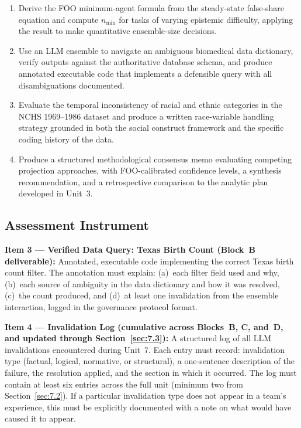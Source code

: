 \begin{enumerate}
    \item Derive the FOO minimum-agent formula from the steady-state
    false-share equation and compute $n_{\min}$ for tasks of
    varying epistemic difficulty, applying the result to make
    quantitative ensemble-size decisions.

    \item Use an LLM ensemble to navigate an ambiguous biomedical
    data dictionary, verify outputs against the authoritative
    database schema, and produce annotated executable code
    that implements a defensible query with all disambiguations
    documented.

    \item Evaluate the temporal inconsistency of racial and ethnic
    categories in the NCHS 1969--1986 dataset and produce a written
    race-variable handling strategy grounded in both the social
    construct framework and the specific coding history of the data.

    \item Produce a structured methodological consensus memo
    evaluating competing projection approaches, with
    FOO-calibrated confidence levels, a synthesis recommendation,
    and a retrospective comparison to the analytic plan developed
    in Unit~3.
\end{enumerate}

\subsection{Assessment Instrument}

\textbf{Item 3 --- Verified Data Query: Texas Birth Count
(Block~B deliverable):}
Annotated, executable code implementing the correct Texas birth
count filter. The annotation must explain: (a)~each filter field
used and why, (b)~each source of ambiguity in the data dictionary
and how it was resolved, (c)~the count produced, and (d)~at least
one invalidation from the ensemble interaction, logged in the
governance protocol format.

\textbf{Item 4 --- Invalidation Log (cumulative across Blocks~B,
C, and~D, and updated through Section~\ref{sec:7.3}):}
A structured log of all LLM invalidations encountered during
Unit~7. Each entry must record: invalidation type (factual,
logical, normative, or structural), a one-sentence description
of the failure, the resolution applied, and the section in which
it occurred. The log must contain at least six entries across
the full unit (minimum two from Section~\ref{sec:7.2}). If a
particular invalidation type does not appear in a team's
experience, this must be explicitly documented with a note on
what would have caused it to appear.


